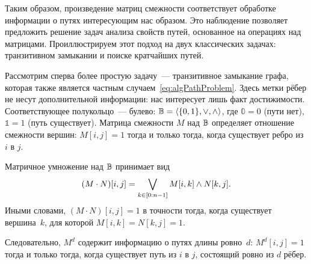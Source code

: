  Таким образом, произведение матриц смежности соответствует обработке информации о путях интересующим нас образом.
 Это наблюдение позволяет предложить решение задач анализа свойств путей, основанное на операциях над матрицами.
 Проиллюстрируем этот подход на двух классических задачах: транзитивном замыкании и поиске кратчайших путей.

 Рассмотрим сперва более простую задачу~--- транзитивное замыкание графа, которая также является частным случаем~\eqref{eq:algPathProblem}.
 Здесь метки рёбер не несут дополнительной информации: нас интересует лишь факт достижимости.
 Соответствующее полукольцо~--- булево: $\mathbb{B} = \langle \{0,1\}, \lor, \land \rangle$, где $\Bbbzero = 0$ (пути нет), $\Bbbone = 1$ (путь существует).
 Матрица смежности $M$ над $\mathbb{B}$ определяет отношение смежности вершин: $M[i,j] = 1$ тогда и только тогда, когда существует ребро из $i$ в $j$.

 Матричное умножение над $\mathbb{B}$ принимает вид
 \[
     (M \cdot N)[i,j] = \bigvee_{k \in [0 \rng n-1]} M[i,k] \land N[k,j].
 \]
 Иными словами, $(M \cdot N)[i,j] = 1$ в точности тогда, когда существует вершина~$k$, для которой $M[i,k] = N[k,j] = 1$.

 Следовательно, $M^d$ содержит информацию о путях длины ровно~$d$: $M^d[i,j] = 1$ тогда и только тогда, когда существует путь из $i$ в $j$, состоящий ровно из $d$ рёбер.


